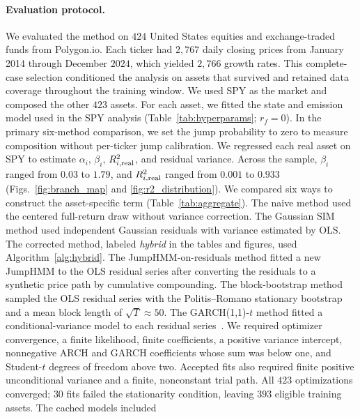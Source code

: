 \FloatBarrier

\paragraph{Evaluation protocol.}

We evaluated the method on $424$ United States equities and exchange-traded funds
from Polygon.io. Each ticker had $2{,}767$ daily closing prices from
January 2014 through December $2024$, which yielded $2{,}766$ growth
rates. This complete-case selection conditioned the analysis on assets
that survived and retained data coverage throughout the training
window. We used SPY as the market and composed the other $423$ assets.
For each asset, we fitted the state and emission model used in the SPY
analysis (Table~\ref{tab:hyperparams}; $r_f=0$). In the primary
six-method comparison, we set the jump probability to zero to measure
composition without per-ticker jump calibration. We regressed each
real asset on SPY to estimate $\alpha_i$, $\beta_i$, $R^2_{i,\mathrm{real}}$,
and residual variance. Across the sample, $\beta_i$ ranged from $0.03$
to $1.79$, and $R^2_{i,\mathrm{real}}$ ranged from $0.001$ to $0.933$
(Figs.~\ref{fig:branch_map} and \ref{fig:r2_distribution}).
We compared six ways to construct the asset-specific term
(Table~\ref{tab:aggregate}). The naive
method used the centered full-return draw without variance correction. The Gaussian
SIM method used independent Gaussian residuals with variance estimated
by OLS. The corrected method, labeled \emph{hybrid} in the tables and
figures, used Algorithm~\ref{alg:hybrid}. The
JumpHMM-on-residuals method fitted a new JumpHMM to the OLS residual
series after converting the residuals to a synthetic price path by
cumulative compounding. The block-bootstrap method sampled the OLS
residual series with the Politis--Romano stationary
bootstrap~\cite{politisRomano1994} and a mean block length of
$\sqrt{T}\approx 50$. The GARCH(1,1)-$t$ method fitted a
conditional-variance model to each residual series~\cite{bollerslev1986}.
We required optimizer convergence, a finite likelihood, finite
coefficients, a positive variance intercept, nonnegative ARCH and
GARCH coefficients whose sum was below one, and Student-$t$ degrees
of freedom above two. Accepted fits also required finite positive
unconditional variance and a finite, nonconstant trial path. All $423$
optimizations converged; $30$ fits failed the stationarity condition,
leaving $393$ eligible training assets. The cached models included

